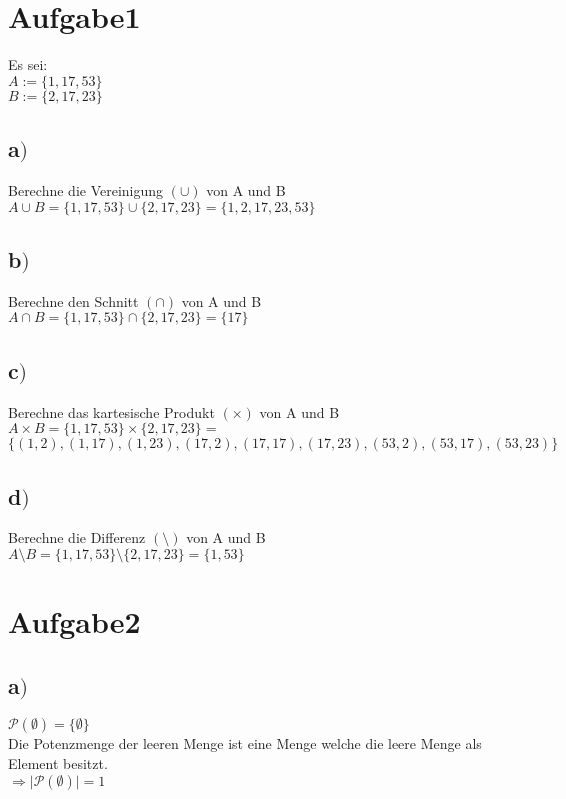 \documentclass[18pt,a4paper]{article}
\begin{document}
	\section*{Aufgabe1}
	Es sei:\\
	$A:= \{1,17,53\}$ \\
	$B:= \{2,17,23\}$
	\subsection*{a$)$ }
	Berechne die Vereinigung $(\cup)$ von A und B\\
	$A \cup B = \{1,17,53\} \cup \{2,17,23\} = \{1,2,17,23,53\} $
	\subsection*{b$)$ }
	Berechne den Schnitt $(\cap)$ von A und B\\
	$A\cap B = \{1,17,53\} \cap \{2,17,23\} = \{17\} $
	\subsection*{c$)$ }
	\doublespacing
	Berechne das kartesische Produkt $(\times)$ von A und B\\
	$A\times B = \{1,17,53\} \times \{2,17,23\} = $\\
	$\{(1,2),(1,17),(1,23),(17,2),(17,17),(17,23),(53,2),(53,17),(53,23)\} $\\
	\singlespacing
	\subsection*{d$)$ }
	Berechne die Differenz $(\setminus)$ von A und B\\
	$A\setminus B = \{1,17,53\} \setminus \{2,17,23\} = \{1,53\} $
	
	\section*{Aufgabe2}
	\subsection*{a$)$ }
	$\mathcal{P}(\emptyset) = \{\emptyset \} $\\
	Die Potenzmenge der leeren Menge ist eine Menge welche die leere Menge als Element besitzt.\\
	$\Longrightarrow\lvert\mathcal{P}(\emptyset)\rvert = 1$
\end{document}
